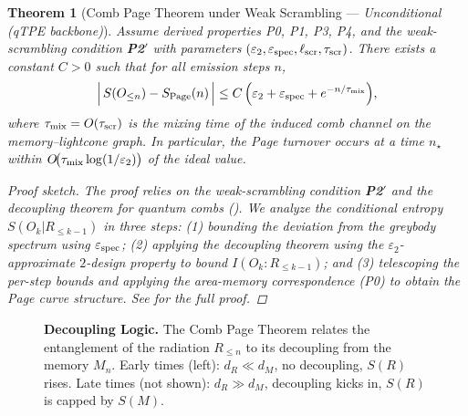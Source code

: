\documentclass[11pt,a4paper]{article}
\newcommand{\PtwoPrime}{\textbf{P2$'$}\xspace}
\theoremstyle{plain}
\newtheorem{theorem}{Theorem}
\theoremstyle{definition}
\theoremstyle{remark}
\begin{document}
\begin{theorem}[Comb Page Theorem under Weak Scrambling --- \emph{Unconditional (qTPE backbone)}]\label{thm:comb-page-weak}
Assume derived properties P0, P1, P3, P4, and the weak-scrambling condition \PtwoPrime{} with parameters $(\varepsilon_2,\varepsilon_{\rm spec},\ell_{\rm scr},\tau_{\rm scr})$. There exists a constant $C>0$ such that for all emission steps $n$,
\begin{equation}
\Big|\, S(O_{\le n}) - S_{\rm Page}(n)\,\Big|
\le C\,\Big(\varepsilon_2 + \varepsilon_{\rm spec} + e^{-n/\tau_{\rm mix}} \Big),
\end{equation}
where $\tau_{\rm mix}=O(\tau_{\rm scr})$ is the mixing time of the induced comb channel on the memory--lightcone graph. In particular, the Page turnover occurs at a time $n_\star$ within $O\!\big(\tau_{\rm mix}\log(1/\varepsilon_2)\big)$ of the ideal value.
\begin{proof}[Proof sketch]
The proof relies on the weak-scrambling condition \PtwoPrime{} and the decoupling theorem for quantum combs (). We analyze the conditional entropy $S(O_k|R_{\le k-1})$ in three steps: (1) bounding the deviation from the greybody spectrum using $\varepsilon_{\rm spec}$; (2) applying the decoupling theorem using the $\varepsilon_2$-approximate $2$-design property to bound $I(O_k:R_{\le k-1})$; and (3) telescoping the per-step bounds and applying the area-memory correspondence (P0) to obtain the Page curve structure. See  for the full proof.
\end{proof}
\end{theorem}

\begin{figure}[t]
\centering
{}
\caption{\textbf{Decoupling Logic.} The Comb Page Theorem relates the entanglement of the radiation $R_{\le n}$ to its decoupling from the memory $M_n$. Early times (left): $d_R \ll d_M$, no decoupling, $S(R)$ rises. Late times (not shown): $d_R \gg d_M$, decoupling kicks in, $S(R)$ is capped by $S(M)$.}
\label{fig:decoupling_diagram}
\end{figure}
\end{document}

